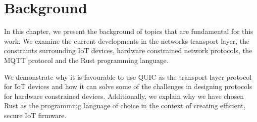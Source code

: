 \chapter{Background} \label{chap:back}

In this chapter, we present the background of topics that are fundamental for this work.
We examine the current developments in the networks transport layer, the constraints surrounding IoT devices, hardware constrained network protocols, the MQTT protocol and the Rust programming language.

We demonstrate why it is favourable to use QUIC as the transport layer protocol for IoT devices and how it can solve some of the challenges in designing protocols for hardware constrained devices.
Additionally, we explain why we have chosen Rust as the programming language of choice in the context of creating efficient, secure IoT firmware.





